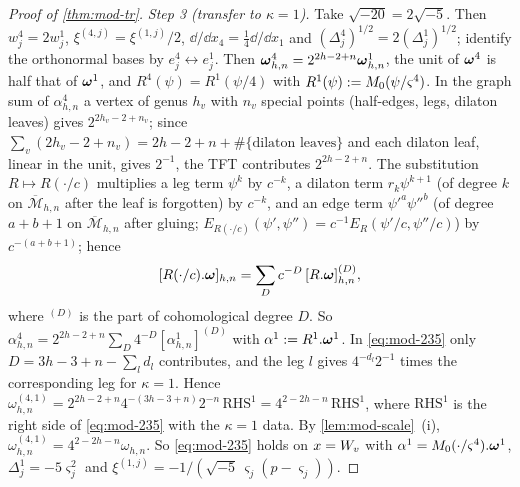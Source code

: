 \begin{proof}[Proof of \cref{thm:mod-tr}]
\emph{Step 3 (transfer to $\kappa=1$).} Take $\sqrt{-20}=2\sqrt{-5}$. Then $w^{4}_j=2w^{1}_j$, $\xi^{(4,j)}=\xi^{(1,j)}/2$, $\dd/\dd x_4=\frac14\dd/\dd x_1$ and $(\Delta^4_j)^{1/2}=2(\Delta^1_j)^{1/2}$; identify the orthonormal bases by $e^4_j\leftrightarrow e^1_j$. Then $\boldsymbol{\omega}^4_{h,n}=2^{2h-2+n}\boldsymbol{\omega}^1_{h,n}$, the unit of $\boldsymbol{\omega}^4$ is half that of $\boldsymbol{\omega}^1$, and $R^4(\psi)=R^1(\psi/4)$ with $R^1(\psi):=M_{0}(\psi/\varsigma^4)$. In the graph sum of $\alpha^4_{h,n}$ a vertex of genus $h_v$ with $n_v$ special points (half-edges, legs, dilaton leaves) gives $2^{2h_v-2+n_v}$; since $\sum_v(2h_v-2+n_v)=2h-2+n+\#\{\text{dilaton leaves}\}$ and each dilaton leaf, linear in the unit, gives $2^{-1}$, the TFT contributes $2^{2h-2+n}$. The substitution $R\mapsto R(\cdot/c)$ multiplies a leg term $\psi^k$ by $c^{-k}$, a dilaton term $r_k\psi^{k+1}$ (of degree $k$ on $\overline{\mathcal M}_{h,n}$ after the leaf is forgotten) by $c^{-k}$, and an edge term $\psi'^a\psi''^b$ (of degree $a+b+1$ on $\overline{\mathcal M}_{h,n}$ after gluing; $E_{R(\cdot/c)}(\psi',\psi'')=c^{-1}E_R(\psi'/c,\psi''/c)$) by $c^{-(a+b+1)}$; hence
\[
[R(\cdot/c).\boldsymbol{\omega}]_{h,n}=\sum_Dc^{-D}\,[R.\boldsymbol{\omega}]^{(D)}_{h,n},
\]
where $^{(D)}$ is the part of cohomological degree $D$. So $\alpha^4_{h,n}=2^{2h-2+n}\sum_D4^{-D}[\alpha^1_{h,n}]^{(D)}$ with $\alpha^1:=R^1.\boldsymbol{\omega}^1$. In \eqref{eq:mod-235} only $D=3h-3+n-\sum_ld_l$ contributes, and the leg $l$ gives $4^{-d_l}2^{-1}$ times the corresponding leg for $\kappa=1$. Hence $\omega^{(4,1)}_{h,n}=2^{2h-2+n}4^{-(3h-3+n)}2^{-n}\,\mathrm{RHS}^1=4^{2-2h-n}\,\mathrm{RHS}^1$, where $\mathrm{RHS}^1$ is the right side of \eqref{eq:mod-235} with the $\kappa=1$ data. By \cref{lem:mod-scale}~(i), $\omega^{(4,1)}_{h,n}=4^{2-2h-n}\omega_{h,n}$. So \eqref{eq:mod-235} holds on $x=W_{v}$ with $\alpha^1=M_{0}(\cdot/\varsigma^4).\boldsymbol{\omega}^1$, $\Delta^1_j=-5\varsigma_j^2$ and $\xi^{(1,j)}=-1/(\sqrt{-5}\,\varsigma_j(p-\varsigma_j))$.


\end{proof}
